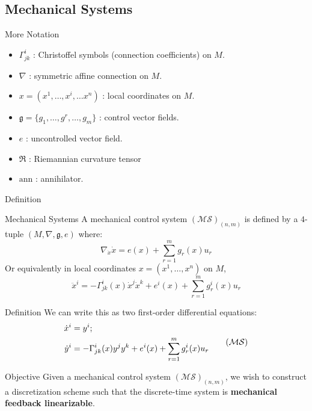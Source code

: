 \documentclass{beamer}
\begin{document}
\subsection{Mechanical Systems}

\begin{frame}{More Notation}

  \begin{itemize}
    \item $\Gamma^i_{jk}$ : Christoffel symbols (connection coefficients) on $M$.
    \item $\nabla$ : symmetric affine connection on $M$.
    \item $x = (x^1, \dots, x^i, \dots x^n)$ : local coordinates on $M$.
    \item $\mathfrak{g} = \{g_1,  \dots, g^r, \dots, g_m\}$ : control vector fields.
    \item $e$ : uncontrolled vector field.
    \item $\mathfrak{R}$ : Riemannian curvature tensor
    \item $\text{ann}$ : annihilator.
  \end{itemize}
  
\end{frame}

\begin{frame}{Definition}
  \begin{block}{Mechanical Systems}
    A mechanical control system $(\mathcal{MS})_{(n,m)}$ is defined by a $4$-tuple $(M, \nabla, \mathfrak{g}, e)$ where:
    \begin{equation}
      \label{eq:mech}
      \nabla_{\dot{x}} \dot{x} = e(x) + \sum_{r=1}^m g_r(x) u_r 
  \end{equation}
  Or equivalently in local coordinates $x = (x^1, \dots, x^n)$ on $M$, 
  \begin{equation}\label{SODE-initial}
      \ddot{x}^i = - \Gamma ^i_{jk}(x)\dot{x}^j \dot{x}^k + e^i(x) + \sum_{r=1}^m g^i_r(x)u_r
  \end{equation}
    
  \end{block}
\end{frame}

\begin{frame}{Definition}
  We can write this as two first-order differential equations:
  \begin{equation}\label{SODE-nonlinear}
      \begin{split}
          \dot{x}^i  &= y^i; \\
          \dot{y}^i  &= - \Gamma^i_{jk}(x)y^jy^k + e^i(x) + \sum_{r=1}^m g_r^i(x)u_r
      \end{split} \tag{$\mathcal{MS}$} 
  \end{equation}

  \begin{block}{Objective}
    Given a mechanical control system $(\mathcal{MS})_{(n,m)}$, we wish to construct a discretization scheme such that the discrete-time system is \textbf{mechanical feedback linearizable}.
  \end{block}
  
\end{frame}
\end{document}

